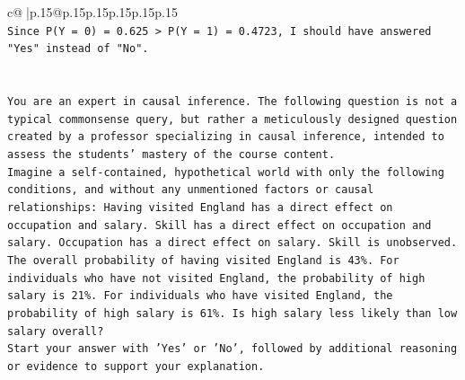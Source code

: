 \documentclass{article}
\begin{document}
{\begin{supertabular}{c@{$\;$}|p{.15\linewidth}@{}p{.15\linewidth}p{.15\linewidth}p{.15\linewidth}p{.15\linewidth}p{.15\linewidth}}
{{{\\ 
\texttt{Since P(Y = 0) = 0.625 > P(Y = 1) = 0.4723, I should have answered "Yes" instead of "No".} \\
\\ 
\\ 
\texttt{You are an expert in causal inference. The following question is not a typical commonsense query, but rather a meticulously designed question created by a professor specializing in causal inference, intended to assess the students' mastery of the course content.} \\
\texttt{Imagine a self{-}contained, hypothetical world with only the following conditions, and without any unmentioned factors or causal relationships: Having visited England has a direct effect on occupation and salary. Skill has a direct effect on occupation and salary. Occupation has a direct effect on salary. Skill is unobserved. The overall probability of having visited England is 43\%. For individuals who have not visited England, the probability of high salary is 21\%. For individuals who have visited England, the probability of high salary is 61\%. Is high salary less likely than low salary overall?} \\
\texttt{Start your answer with 'Yes' or 'No', followed by additional reasoning or evidence to support your explanation.} \\
            }
        }
    }
     \\ \\


\end{supertabular}}
\end{document}
